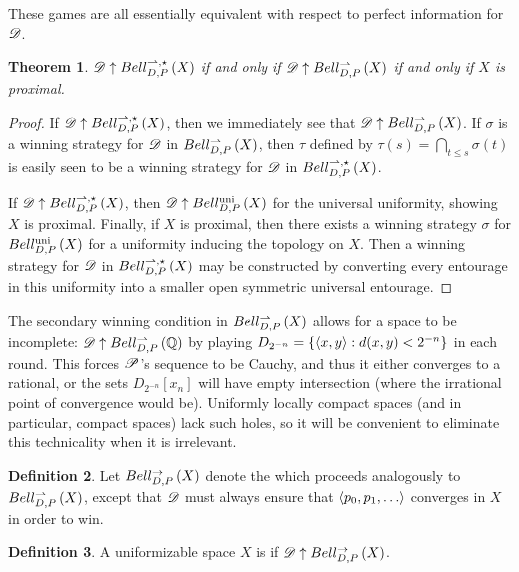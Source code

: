 \documentclass{amsart}
\newtheorem{theorem}{Theorem}[section]
\theoremstyle{definition}
\newtheorem{definition}[theorem]{Definition}
\begin{document}
  These games are all essentially equivalent with respect to perfect
  information for \(\mathscr{D}\).

  \begin{theorem}
    \(\mathscr{D}\uparrow Bell_{D,P}^{\rightharpoonup,\star}\left({X}\right)\) if and only if
    \(\mathscr{D}\uparrow Bell_{D,P}^{\rightharpoonup}\left({X}\right)\) if and only if
    \(X\) is proximal.
  \end{theorem}

  \begin{proof}
    If \(\mathscr{D}\uparrow Bell_{D,P}^{\rightharpoonup,\star}\left({X}\right)\), then we immediately see that
    \(\mathscr{D}\uparrow Bell_{D,P}^{\rightharpoonup}\left({X}\right)\).
    If \(\sigma\) is a winning strategy for \(\mathscr{D}\)
    in \(Bell_{D,P}^{\rightharpoonup}\left({X}\right)\), then \(\tau\) defined by
    \(\tau(s)=\bigcap_{t\leq s}\sigma(t)\) is easily seen to be a winning
    strategy for \(\mathscr{D}\) in \(Bell_{D,P}^{\rightharpoonup,\star}\left({X}\right)\).

    If \(\mathscr{D}\uparrow Bell_{D,P}^{\rightharpoonup,\star}\left({X}\right)\), then \(\mathscr{D}\uparrow Bell_{D,P}^{\textrm{uni}}\left({X}\right)\)
    for the universal uniformity, showing \(X\) is proximal.
    Finally, if \(X\) is proximal, then there exists a winning strategy
    \(\sigma\) for \(Bell_{D,P}^{\textrm{uni}}\left({X}\right)\) for a uniformity inducing the
    topology on \(X\). Then a winning strategy for \(\mathscr{D}\) in
    \(Bell_{D,P}^{\rightharpoonup,\star}\left({X}\right)\) may be constructed by converting every
    entourage in this uniformity into a smaller open symmetric universal
    entourage.
  \end{proof}

  The secondary winning condition in \(Bell_{D,P}^{\rightharpoonup}\left({X}\right)\)
  allows for a space to be incomplete: \(\mathscr{D}\uparrow Bell_{D,P}^{\rightharpoonup}\left({\mathbb{Q}}\right)\) by
  playing \(D_{2^{-n}}=\{\langle x,y\rangle:d(x,y)<2^{-n}\}\) in each round. This
  forces \(\mathscr{P}\)'s sequence to be Cauchy, and thus it either converges to
  a rational, or the sets \(D_{2^{-n}}[x_n]\) will have empty intersection
  (where the irrational point of convergence would be). Uniformly locally
  compact spaces (and in particular, compact spaces) lack such holes, so it
  will be convenient to eliminate this technicality when it is irrelevant.

  \begin{definition}
    Let \(Bell_{D,P}^{\to}\left({X}\right)\) denote the
     which
    proceeds analogously to \(Bell_{D,P}^{\rightharpoonup}\left({X}\right)\), except
    that \(\mathscr{D}\) must always ensure that \(\<p_0,p_1,\dots\>\) converges
    in \(X\) in order to win.
  \end{definition}

  \begin{definition}
    A uniformizable space \(X\) is  if
    \(\mathscr{D} \uparrow Bell_{D,P}^{\to}\left({X}\right)\).
  \end{definition}
\end{document}
